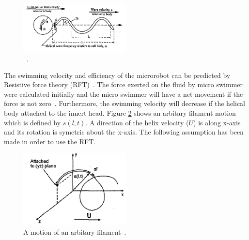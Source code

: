 \documentclass[12pt,a4paper,titlepage]{report}
\begin{document}
\begin{figure}
  \begin{center}
    \includegraphics[width=0.5\textwidth]{motion}
  \caption{~\citep{edd2003biomimetic}.}
  \label{motion}
\end{center}
\end{figure}



The swimming velocity and efficiency of the microrobot can be predicted by Resistive force theory (RFT)~\citep{purcell1997efficiency}. 
The force exerted on the fluid by micro swimmer were calculated initially and the micro swimmer will have a net 
movement if the force is not zero~\citep{Doe:2013:Online}. Furthermore, the swimming velocity will decrease if the helical
body attached to the innert head. Figure \ref{filament} shows an arbitary filament motion which is defined by $s(l,t)$. 
A direction of the helix velocity ($U$) is along x-axis and its rotation is symetric about the x-axis. 
The following assumption has been made in order to use the RFT. 

\begin{figure}
  \begin{center}
    \includegraphics[width=0.5\textwidth]{filament}
  \caption{A motion of an arbitary filament~\citep{edd2003biomimetic}.}
  \label{filament}
\end{center}
\end{figure}
\end{document}
